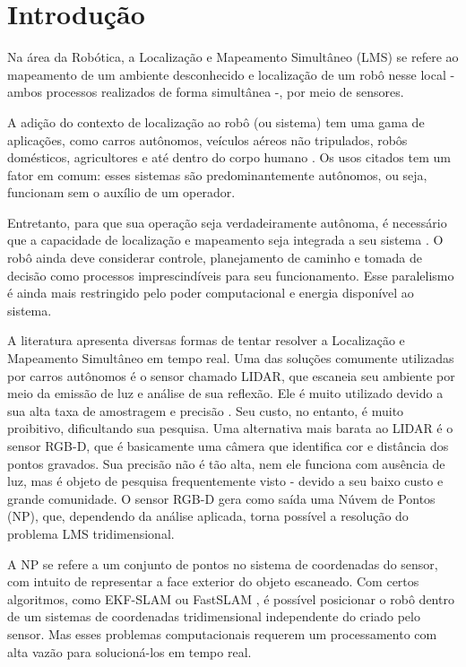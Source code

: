	\chapter*[Introdução]{Introdução}

	Na área da Robótica, a Localização e Mapeamento Simultâneo (LMS) se refere ao mapeamento de um ambiente desconhecido e localização de um robô nesse local - ambos processos realizados de forma simultânea -, por meio de sensores.
	
	A adição do contexto de localização ao robô (ou sistema) tem uma gama de aplicações, como carros autônomos, veículos aéreos não tripulados, robôs domésticos, agricultores e até dentro do corpo humano \cite{bao2014simultaneous}. Os usos citados tem um fator em comum: esses sistemas são predominantemente autônomos, ou seja, funcionam sem o auxílio de um operador.
	
	Entretanto, para que sua operação seja verdadeiramente autônoma, é necessário que a capacidade de localização e mapeamento seja integrada a seu sistema \cite{nikolic2014synchronized}. O robô ainda deve considerar controle, planejamento de caminho e tomada de decisão como processos imprescindíveis para seu funcionamento. Esse paralelismo é ainda mais restringido pelo poder computacional e energia disponível ao sistema.
	
	A literatura apresenta diversas formas de tentar resolver a Localização e Mapeamento Simultâneo em tempo real. Uma das soluções comumente utilizadas por carros autônomos é o sensor chamado LIDAR, que escaneia seu ambiente por meio da emissão de luz e análise de sua reflexão. Ele é muito utilizado devido a sua alta taxa de amostragem e precisão \cite{wolcott2017robust}. Seu custo, no entanto, é muito proibitivo, dificultando sua pesquisa. Uma alternativa mais barata ao LIDAR é o sensor RGB-D, que é basicamente uma câmera que identifica cor e distância dos pontos gravados. Sua precisão não é tão alta, nem ele funciona com ausência de luz, mas é objeto de pesquisa frequentemente visto - devido a seu baixo custo e grande comunidade. O sensor RGB-D gera como saída uma Núvem de Pontos (NP), que, dependendo da análise aplicada, torna possível a resolução do problema LMS tridimensional.
	
	A NP se refere a um conjunto de pontos no sistema de coordenadas do sensor, com intuito de representar a face exterior do objeto escaneado. Com certos algoritmos, como EKF-SLAM ou FastSLAM \cite{durrant2006simultaneous}, é possível posicionar o robô dentro de um sistemas de coordenadas tridimensional independente do criado pelo sensor. Mas esses problemas computacionais requerem um processamento com alta vazão para solucioná-los em tempo real.
		

